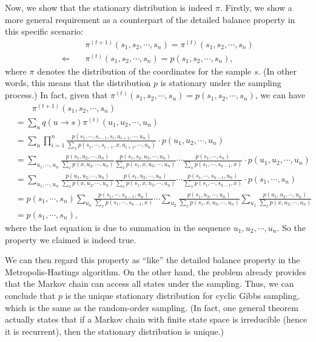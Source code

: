 \documentclass[a4 paper,12pt]{article}
\begin{document}
Now, we show that the stationary distribution is indeed $\pi$. Firstly, we show a more general requirement as a counterpart of the detailed balance property in this specific scenario:
\begin{align*}
	&\pi^{(t+1)}(s_1,s_2,\cdots,s_n)=\pi^{(t)}(s_1,s_2,\cdots,s_n)\\
	\Longleftarrow \quad &\pi^{(t)}(s_1,s_2,\cdots,s_n)=p(s_1,s_2,\cdots,s_n),
\end{align*}
where $\pi$ denotes the distribution of the coordinates for the sample $s$. (In other words, this means that the distribution $p$ is stationary under the sampling process.) In fact, given that $\pi^{(t)}(s_1,s_2,\cdots,s_n)=p(s_1,s_2,\cdots,s_n)$, we can have
\begin{align*}
&\qquad\pi^{(t+1)}(s_1,s_2,\cdots,s_n)\\
&=\sum_u q(u\to s)\pi^{(t)}(u_1,u_2,\cdots,u_n)\\
&=\sum_u \prod_{i=1}^n\frac{p(s_1,\cdots,s_{i-1},s_i,u_{i+1},\cdots,u_n)}{\sum_{x}p(s_1,\cdots,s_{i-1},x,u_{i+1},\cdots,u_n)}\cdot p(u_1,u_2,\cdots,u_n)\\
&=\sum_{u_1,\cdots, u_{n}}\frac{p(s_1,u_2,\cdots,u_n)}{\sum_{x}p(x,u_{2},\cdots,u_n)}\frac{p(s_1,s_2,u_3,\cdots,u_n)}{\sum_{x}p(s_1,x,u_3,\cdots,u_n)}\cdots \frac{p(s_1,\cdots,s_n)}{\sum_{x}p(s_1,\cdots,s_{n-1},x)}\cdot p(u_1,u_2,\cdots,u_n)\\
&=\sum_{u_1,\cdots, u_{n}}\frac{p(u_1,u_2,\cdots,u_n)}{\sum_{x}p(x,u_{2},\cdots,u_n)}\frac{p(s_1,u_2,\cdots,u_n)}{\sum_{x}p(s_1,x,u_3,\cdots,u_n)}\cdots \frac{p(s_1,\cdots,s_{n-1},u_n)}{\sum_{x}p(s_1,\cdots,s_{n-1},x)}\cdot p(s_1,\cdots,s_n) \\
&=p(s_1,\cdots,s_n)\sum_{u_n}\frac{p(s_1,\cdots,s_{n-1},u_n)}{\sum_{x}p(s_1,\cdots,s_{n-1},x)}\cdots\sum_{u_2}\frac{p(s_1,u_2,\cdots,u_n)}{\sum_{x}p(s_1,x,u_3,\cdots,u_n)}\sum_{u_1} \frac{p(u_1,u_2,\cdots,u_n)}{\sum_{x}p(x,u_{2},\cdots,u_n)}\\
&=p(s_1,\cdots,s_n),
\end{align*} where the last equation is due to summation in the sequence $u_1,u_2,\cdots,u_n$. So the property we claimed is indeed true.

We can then regard this property as ``like'' the detailed balance property in the Metropolis-Hastings algorithm. On the other hand, the problem already provides that the Markov chain can access all states under the sampling. Thus, we can conclude that $p$ is the unique stationary distribution for cyclic Gibbs sampling, which is the same as the random-order sampling. (In fact, one general theorem actually states that if a Markov chain with finite state space is irreducible (hence it is recurrent), then the stationary distribution is unique.)
\end{document}
